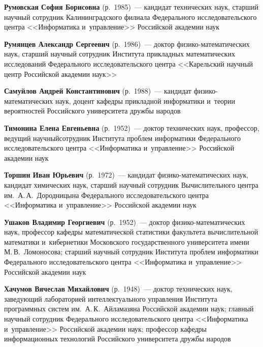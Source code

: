 \begin{multicols}{2}
\pagebreak

\noindent
\textbf{Румовская София Борисовна} (р.\ 1985)~--- 
кандидат технических наук, старший научный сотрудник Калининградского филиала Федерального исследовательского цент\-ра 
<<Информатика и~управ\-ле\-ние>> Российской академии наук

\noindent
\textbf{Румянцев Александр Сергеевич} (р.\ 1986)~--- доктор фи\-зи\-ко-ма\-те\-ма\-ти\-че\-ских наук, старший 
научный сотрудник Института при\-клад\-ных математических исследований 
Федерального \mbox{исследовательского} цент\-ра <<Карельский научный центр Российской академии наук>>

\noindent
\textbf{Самуйлов Андрей Константинович} (р.\ 1988)~--- кандидат фи\-зи\-ко-ма\-те\-ма\-ти\-че\-ских наук, 
доцент ка\-фед\-ры при\-клад\-ной информатики и~тео\-рии вероятностей Российского университета друж\-бы народов

\noindent
\textbf{Тимонина Елена Евгеньевна} (р.\ 1952)~--- 
доктор технических наук, профессор, ведущий научный\linebreak сотрудник Института проб\-лем {информатики} Федерального исследовательского цент\-ра 
<<Информатика и~управ\-ле\-ние>> Российской академии наук

\noindent
\textbf{Торшин Иван Юрьевич} (р.\ 1972)~--- кандидат фи\-зи\-ко-ма\-те\-ма\-ти\-че\-ских наук, 
кандидат химических наук, старший научный сотрудник Вычислительного центра им.\ А.\,А.~Дородницына 
Федерального исследовательского цент\-ра <<Информатика и~управ\-ле\-ние>> Российской академии наук


\noindent
\textbf{Ушаков Владимир Георгиевич} (р.\ 1952)~--- доктор фи\-зи\-ко-ма\-те\-ма\-ти\-че\-ских наук, 
профессор ка\-фед\-ры математической ста\-ти\-сти\-ки факультета вы\-чис\-ли\-тель\-ной математики и~кибернетики Московского государственного университета имени 
М.\,В.~Ломоносова; старший научный сотрудник Института проб\-лем информатики Федерального исследовательского цент\-ра 
<<Информатика и~управ\-ле\-ние>> Российской академии наук 


\noindent
\textbf{Хачумов Вячеслав Михайлович} (р.\ 1948)~--- 
доктор технических наук, за\-ве\-ду\-ющий лабораторией интеллектуального управ\-ле\-ния Института программных сис\-тем им.\ 
А.\,К.~Айламазяна Российской академии наук; главный научный сотрудник Федерального исследовательского цент\-ра 
<<Информатика и~управ\-ле\-ние>> Российской академии наук;\linebreak 
профессор кафедры информационных технологий Российского университета друж\-бы народов


\end{multicols}
